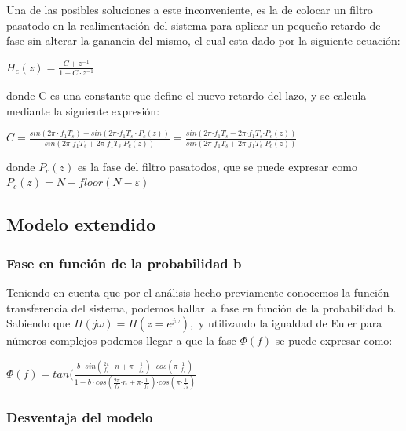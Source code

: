 \documentclass[../ASSD_TP2.tex]{subfiles}
\begin{document}
Una de las posibles soluciones a este inconveniente, es la de colocar
un filtro pasatodo en la realimentación del sistema para aplicar un
pequeño retardo de fase sin alterar la ganancia del mismo, el cual
esta dado por la siguiente ecuación:
\begin{center}
$H_{c}(z)=\frac{C+z^{-1}}{1+C\cdot z^{-1}}$
\par\end{center}

donde C es una constante que define el nuevo retardo del lazo, y se
calcula mediante la siguiente expresión:
\begin{center}
$C=\frac{sin(2\pi\cdot f_{1}T_{s})-sin(2\pi\text{·}f_{1}T_{s}\cdot P_{c}(z))}{sin(2\pi\text{·}f_{1}T_{s}+2\pi\text{·}f_{1}T_{s}\text{·}P_{c}(z))}=\frac{sin(2\pi\text{·}f_{1}T_{s}-2\pi\text{·}f_{1}T_{s}\text{·}P_{c}(z))}{sin(2\pi\text{·}f_{1}T_{s}+2\pi\text{·}f_{1}T_{s}\text{·}P_{c}(z))}$
\par\end{center}

donde $P_{c}(z)$ es la fase del filtro pasatodos, que se puede expresar
como $P_{c}(z)=N-floor(N-\varepsilon)$

\subsection{Modelo extendido }

\subsubsection{Fase en función de la probabilidad b}

Teniendo en cuenta que por el análisis hecho previamente conocemos
la función transferencia del sistema, podemos hallar la fase en función
de la probabilidad b. Sabiendo que $H(j\omega)=H(z=e^{j\omega}),$
y utilizando la igualdad de Euler para números complejos podemos llegar
a que la fase $\Phi(f)$ se puede expresar como:
\begin{center}
$\Phi(f)=tan(\frac{b\cdot sin(\frac{2\pi}{f_{s}}\cdot n+\pi\cdot\frac{1}{f_{s}})\cdot cos(\pi\text{·}\frac{1}{f_{s}})}{1-b\cdot cos(\frac{2\pi}{f_{s}}\text{·}n+\pi\text{·}\frac{1}{f_{s}})\text{·}cos(\pi\text{·}\frac{1}{f_{s}})}$
\par\end{center}

\subsubsection{Desventaja del modelo}
\end{document}
